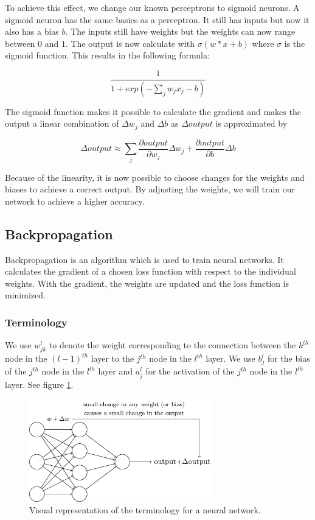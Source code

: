 To achieve this effect, we change our known perceptrons to sigmoid neurons. A sigmoid neuron has the same basics as a perceptron. It still has inputs but now it also has a bias $b$. The inputs still have weights but the weights can now range between $0$ and $1$. The output is now calculate with $\sigma(w*x+b)$ where $\sigma$ is the sigmoid function. This results in the following formula: 

\begin{equation} 
\frac{1}{1+exp(-\sum_j w_jx_j-b)}
\end{equation}

The sigmoid function makes it possible to calculate the gradient and makes the output a linear combination of $\Delta w_j$ and $\Delta b$ as $\Delta output$ is approximated by 

\begin{equation} 
\Delta output \approx \sum_j \frac{\partial output}{\partial w_j}\Delta w_j + \frac{\partial output}{\partial b}\Delta b
\end{equation}

Because of the linearity, it is now possible to choose changes for the weights and biases to achieve a correct output. By adjusting the weights, we will train our network to achieve a higher accuracy.
		
	\subsection{Backpropagation}
	
Backpropagation is an algorithm which is used to train neural networks. It calculates the gradient of a chosen loss function with respect to the individual weights. With the gradient, the weights are updated and the loss function is minimized.

		\subsubsection{Terminology}
		
We use $w^l_{jk}$ to denote the weight corresponding to the connection between the $k^{th}$ node in the $(l-1)^{th}$ layer to the $j^{th}$ node in the $l^{th}$ layer. We use $b^l_j$ for the bias of the $j^{th}$ node in the $l^{th}$ layer and $a^l_j$ for the activation of the $j^{th}$ node in the $l^{th}$ layer. See figure \ref{fig:termNN}.

\begin{figure}[H]
	\centering
	\includegraphics[width=8cm]{smallChange.png}
	\caption{Visual representation of the terminology for a neural network.}
	\label{fig:termNN}
\end{figure} 

